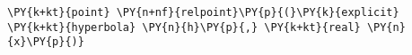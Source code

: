 \begin{Verbatim}[commandchars=\\\{\}]
    \PY{k+kt}{point} \PY{n+nf}{relpoint}\PY{p}{(}\PY{k}{explicit} \PY{k+kt}{hyperbola} \PY{n}{h}\PY{p}{,} \PY{k+kt}{real} \PY{n}{x}\PY{p}{)}
\end{Verbatim}
